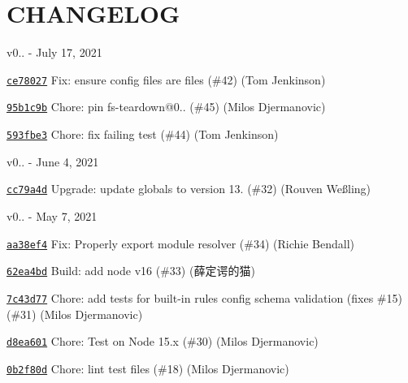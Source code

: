 \chapter{CHANGELOG}
\hypertarget{md__c_1_2_users_2_s_t_r_i_d_e_r_2source_2repos_2_internal_a_p_i_2_internal_a_p_i_2wwwroot_2lib_2b94e05b5c137046706c7e31a4f6560ad}{}\label{md__c_1_2_users_2_s_t_r_i_d_e_r_2source_2repos_2_internal_a_p_i_2_internal_a_p_i_2wwwroot_2lib_2b94e05b5c137046706c7e31a4f6560ad}
v0.. -\/ July 17, 2021


\begin{DoxyItemize}
\item \href{https://github.com/eslint/eslintrc/commit/ce78027f6a319a29fdf0b78ac1e7071373acffc4}{\texttt{ {\ttfamily ce78027}}} Fix\+: ensure config files are files (\#42) (Tom Jenkinson)
\item \href{https://github.com/eslint/eslintrc/commit/95b1c9b30267479a75cd07768f8f9e9cfa63c105}{\texttt{ {\ttfamily 95b1c9b}}} Chore\+: pin fs-\/teardown@0.. (\#45) (Milos Djermanovic)
\item \href{https://github.com/eslint/eslintrc/commit/593fbe3c2c1c5f723f71810963ed21a56caed4c1}{\texttt{ {\ttfamily 593fbe3}}} Chore\+: fix failing test (\#44) (Tom Jenkinson)
\end{DoxyItemize}

v0.. -\/ June 4, 2021


\begin{DoxyItemize}
\item \href{https://github.com/eslint/eslintrc/commit/cc79a4db45a2ca0236a846ed8eba28eea07d4db5}{\texttt{ {\ttfamily cc79a4d}}} Upgrade\+: update globals to version 13. (\#32) (Rouven Weßling)
\end{DoxyItemize}

v0.. -\/ May 7, 2021


\begin{DoxyItemize}
\item \href{https://github.com/eslint/eslintrc/commit/aa38ef40c3123f8f534c7f9b0b7c306f5f011dce}{\texttt{ {\ttfamily aa38ef4}}} Fix\+: Properly export module resolver (\#34) (Richie Bendall)
\item \href{https://github.com/eslint/eslintrc/commit/62ea4bd74b78fbeff12ffb21f1f978817601d4d1}{\texttt{ {\ttfamily 62ea4bd}}} Build\+: add node v16 (\#33) (薛定谔的猫)
\item \href{https://github.com/eslint/eslintrc/commit/7c43d7784e39cf0b7b102af64f703cade11252bb}{\texttt{ {\ttfamily 7c43d77}}} Chore\+: add tests for built-\/in rules config schema validation (fixes \#15) (\#31) (Milos Djermanovic)
\item \href{https://github.com/eslint/eslintrc/commit/d8ea601ecb4b9f81cdc332b012b6b1bbc984366c}{\texttt{ {\ttfamily d8ea601}}} Chore\+: Test on Node 15.\+x (\#30) (Milos Djermanovic)
\item \href{https://github.com/eslint/eslintrc/commit/0b2f80d6f6b33e4c5e168b08468867653f726754}{\texttt{ {\ttfamily 0b2f80d}}} Chore\+: lint test files (\#18) (Milos Djermanovic)
\end{DoxyItemize}

